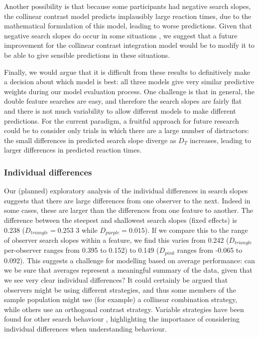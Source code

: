 \documentclass[preprint,12pt,authoryear]{elsarticle}
\begin{document}
Another possibility is that because some participants had negative search slopes, the collinear contrast model predicts implausibly large reaction times, due to the mathematical formulation of this model, leading to worse predictions. Given that negative search slopes do occur in some situations \citep{utochkin2013visual}, we suggest that a future improvement for the collinear contrast integration model would be to modify it to be able to give sensible predictions in these situations.

Finally, we would argue that it is difficult from these results to definitively make a decision about which model is best: all three models give very similar predictive weights during our model evaluation process. One challenge is that in general, the double feature searches are easy, and therefore the search slopes are fairly flat and there is not much variability to allow different models to make different predictions. For the current paradigm, a fruitful approach for future research could be to consider only trials in which there are a large number of distractors: the small differences in predicted search slope diverge as $D_T$ increases, leading to larger  differences in predicted reaction times.

\subsubsection{Individual differences}

Our (planned) exploratory analysis of the individual differences in search slopes suggests that there are large differences from one observer to the next. Indeed in some cases, these are larger than the differences from one feature to another. The difference between the steepest and shallowest search slopes (fixed effects) is 0.238 ($D_{triangle} = 0.253$ 3 while $D_{purple} = 0.015$). If we compare this to the range of observer search slopes within a feature, we find this varies from 0.242 ($D_{triangle}$ per-observer ranges from 0.395 to 0.152) to 0.149 ($D_{pink}$ ranges from -0.065 to 0.092). This suggests a challenge for modelling based on average performance: can we be sure that averages represent a meaningful summary of the data, given that we see very clear individual differences? It could certainly be argued that observers might be using different strategies, and thus some members of the sample population might use (for example) a collinear combination strategy, while others use an orthogonal contrast strategy. Variable strategies have been found for other search behaviour \citep{clarke2022stable, kristjansson2014common, proulx2011individual, li2022assessing}, highlighting the importance of considering individual differences when understanding behaviour.
\end{document}
